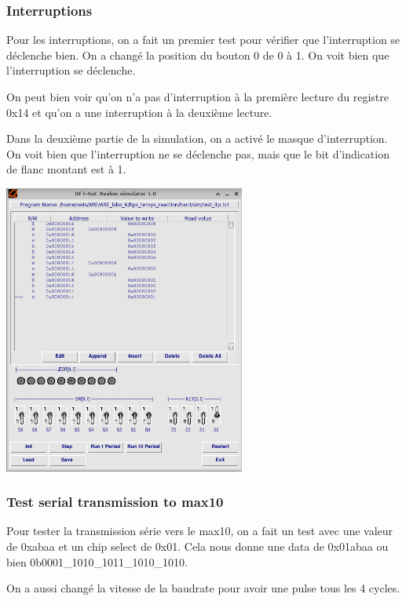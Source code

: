 \documentclass[a4paper,12pt]{article}
\begin{document}
\break

\subsubsection{Interruptions}

Pour les interruptions, on a fait un premier test pour vérifier que l'interruption se déclenche bien. On a changé la position du bouton 0 de 0 à 1. On voit bien que l'interruption se déclenche.

On peut bien voir qu'on n'a pas d'interruption à la première lecture du registre 0x14 et qu'on a une interruption à la deuxième lecture.

Dans la deuxième partie de la simulation, on a activé le masque d'interruption. On voit bien que l'interruption ne se déclenche pas, mais que le bit d'indication de flanc montant est à 1.

\begin{center}
    \includegraphics[width=300px]{test_itp.png}
\end{center}

\break

\subsubsection{Test serial transmission to max10}

Pour tester la transmission série vers le max10, on a fait un test avec une valeur de 0xabaa et un chip select de 0x01. Cela nous donne une data de 0x01abaa ou bien 0b0001\_1010\_1011\_1010\_1010.

On a aussi changé la vitesse de la baudrate pour avoir une pulse tous les 4 cycles. 
\end{document}
